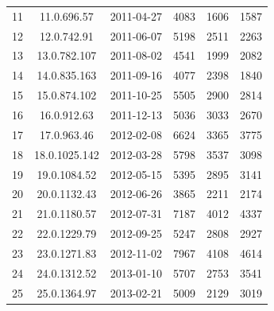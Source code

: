\begin{table}[!hbt]
\begin{center}
\begin{tabular}{l| c c c c c}
             11               & 11.0.696.57   & 2011-04-27   &    4083                &         1606                &      1587 \\
             12               & 12.0.742.91   & 2011-06-07   &    5198                &         2511                &      2263 \\
             13               & 13.0.782.107  & 2011-08-02   &    4541                &         1999                &      2082 \\
             14               & 14.0.835.163  & 2011-09-16   &    4077                &         2398                &      1840 \\
             15               & 15.0.874.102  & 2011-10-25   &    5505                &         2900                &      2814 \\
             16               & 16.0.912.63   & 2011-12-13   &    5036                &         3033                &      2670 \\
             17               & 17.0.963.46   & 2012-02-08   &    6624                &         3365                &      3775 \\
             18               & 18.0.1025.142 & 2012-03-28   &    5798                &         3537                &      3098 \\
             19               & 19.0.1084.52  & 2012-05-15   &    5395                &         2895                &      3141 \\
             20               & 20.0.1132.43  & 2012-06-26   &    3865                &         2211                &      2174 \\
             21               & 21.0.1180.57  & 2012-07-31   &    7187                &         4012                &      4337 \\
             22               & 22.0.1229.79  & 2012-09-25   &    5247                &         2808                &      2927 \\
             23               & 23.0.1271.83  & 2012-11-02   &    7967                &         4108                &      4614 \\
             24               & 24.0.1312.52  & 2013-01-10   &    5707                &         2753                &      3541 \\
             25               & 25.0.1364.97  & 2013-02-21   &    5009                &         2129                &      3019 \\ \bottomrule
            \end{tabular}
      \end{center}
\end{table}

